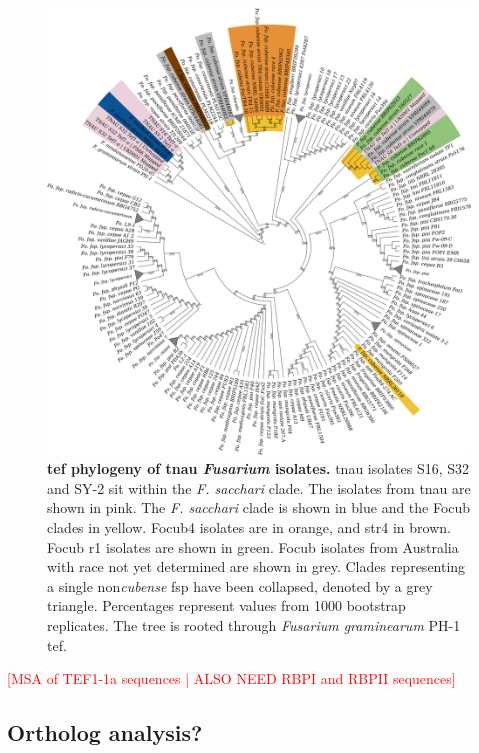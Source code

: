 \begin{figure}[h!]
    \centering
    \includegraphics[width=14cm]{Figures/TEF1aPhylo-Including_mindanoense.png}
    \caption[\Acl{tef} phylogeny of \acl{tnau} \textit{Fusarium} isolates.]{\textbf{\Acl{tef} phylogeny of \acl{tnau} \textit{Fusarium} isolates.} \Ac{tnau} isolates S16, S32 and SY-2 sit within the\textit{ F. sacchari} clade. The isolates from \ac{tnau} are shown in pink. The \textit{F. sacchari} clade is shown in blue and the \acl{Focub} clades in yellow. \Acl{Focub4} isolates are in orange, and \ac{str4} in brown. \Ac{Focub} \acl{r1} isolates are shown in green. \ac{Focub} isolates from Australia with race not yet determined are shown in grey. Clades representing a single non\-\textit{cubense} \ac{fsp} have been collapsed, denoted by a grey triangle.  Percentages represent values from 1000 bootstrap replicates. The tree is rooted through \textit{Fusarium graminearum} PH-1 \ac{tef}.}
    \label{fig:TEF1aPhylo}
\end{figure}

\textcolor{red}{[MSA of TEF1-1a sequences | ALSO NEED RBPI and RBPII sequences]}

\subsection{Ortholog analysis?}

